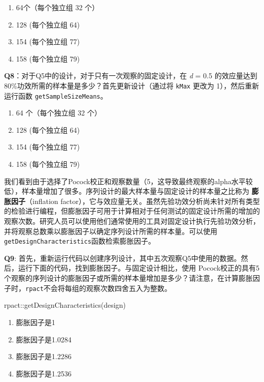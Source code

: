 \documentclass[
  letterpaper,
  DIV=11,
  numbers=noendperiod]{scrreprt}
\newenvironment{Shaded}{\begin{snugshade}}{\end{snugshade}}
\newcommand{\FunctionTok}[1]{\textcolor[rgb]{0.28,0.35,0.67}{#1}}
\newcommand{\NormalTok}[1]{\textcolor[rgb]{0.00,0.23,0.31}{#1}}
\newcommand{\SpecialCharTok}[1]{\textcolor[rgb]{0.37,0.37,0.37}{#1}}
\providecommand{\tightlist}{%
  \setlength{\itemsep}{0pt}\setlength{\parskip}{0pt}}\usepackage{longtable,booktabs,array}
\begin{document}
\begin{enumerate}
\def\labelenumi{\Alph{enumi})}
\tightlist
\item
  64个（每个独立组 32 个）
\item
  128 (每个独立组 64)
\item
  154 (每个独立组 77)
\item
  158 (每个独立组 79)
\end{enumerate}

\textbf{Q8}：对于Q5中的设计，对于只有一次观察的固定设计，在 \emph{d} =
0.5 的效应量达到80\%功效所需的样本量是多少？首先更新设计（通过将
\texttt{kMax} 更改为 1），然后重新运行函数 \texttt{getSampleSizeMeans}。

\begin{enumerate}
\def\labelenumi{\Alph{enumi})}
\tightlist
\item
  64 个（每个独立组 32 个）
\item
  128 (每个独立组 64)
\item
  154 (每个独立组 77)
\item
  158 (每个独立组 79)
\end{enumerate}

我们看到由于选择了Pocock校正和观察数量（5，这导致最终观察的alpha水平较低），样本量增加了很多。序列设计的最大样本量与固定设计的样本量之比称为
\textbf{膨胀因子}（inflation
factor），它与效应量无关。虽然先验功效分析尚未针对所有类型的检验进行编程，但膨胀因子可用于计算相对于任何测试的固定设计所需的增加的观察次数。研究人员可以使用他们通常使用的工具对固定设计执行先验功效分析，并将观察总数乘以膨胀因子以确定序列设计所需的样本量。可以使用\texttt{getDesignCharacteristics}函数检索膨胀因子。

\textbf{Q9}:
首先，重新运行代码以创建序列设计，其中五次观察Q5中使用的数据。然后，运行下面的代码，找到膨胀因子。与固定设计相比，使用
Pocock校正的具有5个观察的序列设计的膨胀因子或所需的样本量增加是多少？请注意，在计算膨胀因子时，\texttt{rpact}不会将每组的观察次数四舍五入为整数。

\begin{Shaded}
\begin{Highlighting}[]
\NormalTok{rpact}\SpecialCharTok{::}\FunctionTok{getDesignCharacteristics}\NormalTok{(design)}
\end{Highlighting}
\end{Shaded}

\begin{enumerate}
\def\labelenumi{\Alph{enumi})}
\tightlist
\item
  膨胀因子是1
\item
  膨胀因子是1.0284
\item
  膨胀因子是1.2286
\item
  膨胀因子是1.2536
\end{enumerate}
\end{document}
